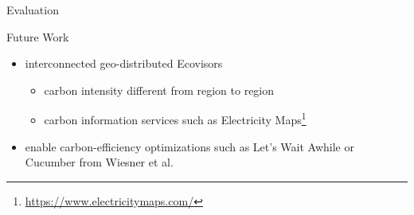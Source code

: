 \begin{frame}{Evaluation}
\end{frame}

\begin{frame}{Future Work}
    \begin{itemize}
        \item interconnected geo-distributed Ecovisors
            \begin{itemize}
                \item carbon intensity different from region to region
                \item carbon information services such as Electricity
                    Maps\footnote{\url{https://www.electricitymaps.com/}\vspace{1cm}}
            \end{itemize}
    \end{itemize}
    \begin{itemize}
        \item[\arrow] enable carbon-efficiency optimizations such as
            Let's Wait Awhile or Cucumber from Wiesner et al. \cite{wiesner2021,
            wiesner2022}
    \end{itemize}
\end{frame}
